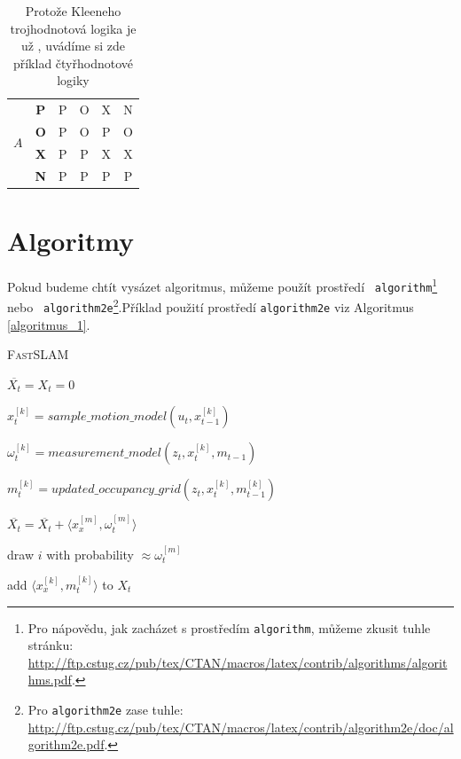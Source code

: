 \documentclass[a4paper, 11pt]{article}
\begin{document}
\begin{table}[h]
\begin{tabular}{|c|c|c|c|c|c|}
            \multirow{4}{*}{$A$} & \textbf{P} & P & O & X & N \\ \cline{2-6} 
             & \textbf{O} & P & O & P & O \\ \cline{2-6} 
             & \textbf{X} & P & P & X & X \\ \cline{2-6} 
             & \textbf{N} & P & P & P & P \\ \hline
        \end{tabular}
    \caption{Protože Kleeneho trojhodnotová logika je už , uvádíme si zde příklad čtyřhodnotové logiky \bigskip}
    \label{table_2}
    \end{table}
    
    \section{Algoritmy}
    \label{sekce_3}
    Pokud budeme chtít vysázet algoritmus, můžeme použít prostředí \verb! algorithm!\footnote{Pro nápovědu, jak zacházet s prostředím \texttt{algorithm}, můžeme zkusit tuhle stránku: \newline
	\url{http://ftp.cstug.cz/pub/tex/CTAN/macros/latex/contrib/algorithms/algorithms.pdf}.} nebo \verb! algorithm2e!\footnote{Pro \texttt{algorithm2e} zase tuhle: \url{http://ftp.cstug.cz/pub/tex/CTAN/macros/latex/contrib/algorithm2e/doc/algorithm2e.pdf}.}.\break Příklad použití prostředí \verb!algorithm2e! viz Algoritmus \ref{algoritmus_1}.
	
	\bigskip
	
	\begin{algorithm}
	    \label{algoritmus_1}
	    \IncMargin{1.5em}
	    \caption{\textsc{FastSLAM}}
	    \SetNlSkip{-1.17em}
	    \SetInd{2em}{0em}
	    \Indpp\Indp\Indpp
	    \BlankLine
	    $\overline{X_t} = X_t = 0$
	    
	    {$x_{t}^{[k]} = \textit{sample\_motion\_model}(u_t, x_{t-1}^{[k]})$
	    
	    $\omega_{t}^{[k]} = \textit{measurement\_model}(z_t, x_t^{[k]}, m_{t-1})$
	    
	    $m_t^{[k]} = updated\_occupancy\_grid(z_t, x_t^{[k]}, m_{t-1}^{[k]})$
	    
	    $\overline{X_t} = \overline{X_t} + \langle x_x^{[m]}, \omega_t^{[m]} \rangle$}
	    {draw $i$ with probability $\approx \omega_t^{[m]}$
	    
	    add $\langle x_x^{[k]}, m_t^{[k]} \rangle$ to $X_t$}
	\end{algorithm}
	
\end{document}
